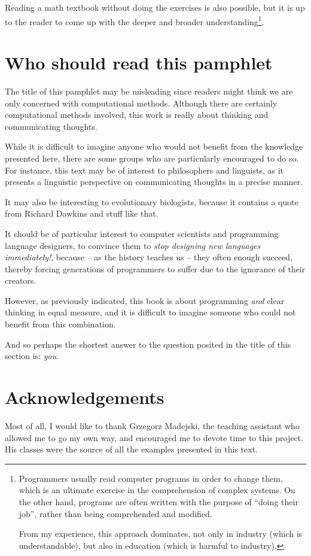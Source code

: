 Reading a math textbook without doing the exercises is also
possible, but it is up to the reader to come up
with the deeper and broader understanding\footnote{
Programmers usually read computer programs in order
to change them, which is an ultimate exercise
in the comprehension of complex systems. On the
other hand, programs are often written with the
purpose of ``doing their job'', rather than
being comprehended and modified.

From my experience, this approach dominates,
not only in industry (which is understandable),
but also in education (which is harmful to industry).
}.

\section*{Who should read this pamphlet}

The title of this pamphlet may be misleading since readers
might think we are only concerned with computational methods.
Although there are certainly computational methods
involved, this work is really about thinking
and communicating thoughts.

While it is difficult to imagine anyone who would not benefit
from the knowledge presented here, there are some groups who
are particularly encouraged to do so. For instance, this text
may be of interest to philosophers and linguists, as it presents
a linguistic perspective on communicating thoughts
in a precise manner.

It may also be interesting to evolutionary biologists,
because it contains a quote from Richard Dawkins
and stuff like that.

It should be of particular interest to computer
scientists and programming language designers, to
convince them to \textit{stop designing new languages immediately!},
because -- as the history teaches us -- they often enough
succeed, thereby forcing generations of programmers to
suffer due to the ignorance of their creators.

However, as previously indicated, this book is about programming
\textit{and} clear thinking in equal measure, and
it is difficult to imagine someone who could not
benefit from this combination.

And so perhaps the shortest answer to the question posited
in the title of this section is: \textit{you}.

\section*{Acknowledgements}
Most of all, I would like to thank Grzegorz Madejski, the teaching
assistant who allowed me to go my own way,
and encouraged me to devote time to this project.
His classes were the source of all the examples presented in this text.

